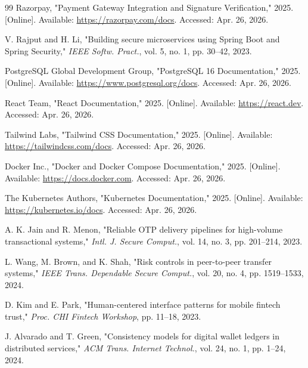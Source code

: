 \documentclass[conference]{IEEEtran}
\begin{document}
\begin{thebibliography}{99}
Razorpay, "Payment Gateway Integration and Signature Verification," 2025. [Online]. Available: \url{https://razorpay.com/docs}. Accessed: Apr. 26, 2026.

V. Rajput and H. Li, "Building secure microservices using Spring Boot and Spring Security," \emph{IEEE Softw. Pract.}, vol. 5, no. 1, pp. 30--42, 2023.

PostgreSQL Global Development Group, "PostgreSQL 16 Documentation," 2025. [Online]. Available: \url{https://www.postgresql.org/docs}. Accessed: Apr. 26, 2026.

React Team, "React Documentation," 2025. [Online]. Available: \url{https://react.dev}. Accessed: Apr. 26, 2026.

Tailwind Labs, "Tailwind CSS Documentation," 2025. [Online]. Available: \url{https://tailwindcss.com/docs}. Accessed: Apr. 26, 2026.

Docker Inc., "Docker and Docker Compose Documentation," 2025. [Online]. Available: \url{https://docs.docker.com}. Accessed: Apr. 26, 2026.

The Kubernetes Authors, "Kubernetes Documentation," 2025. [Online]. Available: \url{https://kubernetes.io/docs}. Accessed: Apr. 26, 2026.

A. K. Jain and R. Menon, "Reliable OTP delivery pipelines for high-volume transactional systems," \emph{Intl. J. Secure Comput.}, vol. 14, no. 3, pp. 201--214, 2023.

L. Wang, M. Brown, and K. Shah, "Risk controls in peer-to-peer transfer systems," \emph{IEEE Trans. Dependable Secure Comput.}, vol. 20, no. 4, pp. 1519--1533, 2024.

D. Kim and E. Park, "Human-centered interface patterns for mobile fintech trust," \emph{Proc. CHI Fintech Workshop}, pp. 11--18, 2023.

J. Alvarado and T. Green, "Consistency models for digital wallet ledgers in distributed services," \emph{ACM Trans. Internet Technol.}, vol. 24, no. 1, pp. 1--24, 2024.

\end{thebibliography}
\end{document}
